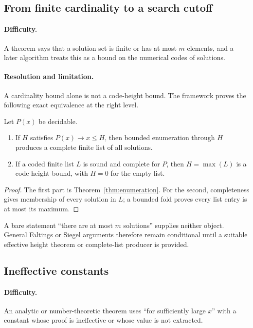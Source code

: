 \subsection{From finite cardinality to a search cutoff}

\paragraph{Difficulty.}
A theorem says that a solution set is finite or has at most \(m\) elements, and
a later algorithm treats this as a bound on the numerical codes of solutions.

\paragraph{Resolution and limitation.}
A cardinality bound alone is not a code-height bound.  The framework proves the
following exact equivalence at the right level.

\begin{theorem}\label{thm:height-list}
Let \(P(x)\) be decidable.
\begin{enumerate}
\item If \(H\) satisfies \(P(x)\to x\le H\), then bounded enumeration through
\(H\) produces a complete finite list of all solutions.
\item If a coded finite list \(L\) is sound and complete for \(P\), then
\(H=\max(L)\) is a code-height bound, with \(H=0\) for the empty list.
\end{enumerate}
\end{theorem}

\begin{proof}
The first part is Theorem~\ref{thm:enumeration}.  For the second, completeness
gives membership of every solution in \(L\); a bounded fold proves every list
entry is at most its maximum.
\end{proof}

A bare statement ``there are at most \(m\) solutions'' supplies neither object.
General Faltings or Siegel arguments therefore remain conditional until a
suitable effective height theorem or complete-list producer is provided.

\subsection{Ineffective constants}

\paragraph{Difficulty.}
An analytic or number-theoretic theorem uses ``for sufficiently large \(x\)''
with a constant whose proof is ineffective or whose value is not extracted.


